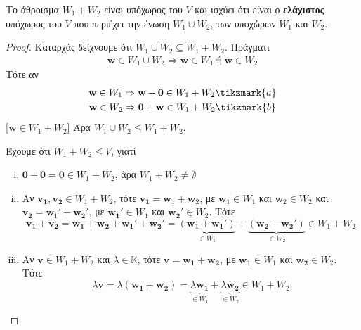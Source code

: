 \begin{prop}
  Το άθροισμα $ W_{1}+W_{2} $ είναι υπόχωρος του $V$ και ισχύει ότι είναι ο 
  \textbf{ελάχιστος} υπόχωρος του $V$ που περιέχει την ένωση 
  $ W_{1} \cup W_{2} $, των υποχώρων $ W_{1} $ και $ W_{2} $. 
\end{prop}

\begin{proof}
\item {}
  Καταρχάς δείχνουμε ότι $ W_{1} \cup W_{2} \subseteq W_{1}+W_{2} $. Πράγματι
  \begin{gather*}
    \mathbf{w} \in W_{1} \cup W_{2} \Rightarrow \mathbf{w} \in W_{1} \; \text{ή} \; 
    \mathbf{w} \in W_{2} 
  \end{gather*}
  Τότε αν
  \begin{gather*}
    \mathbf{w} \in W_{1} \Rightarrow \mathbf{w} + \mathbf{0} \in W_{1}+W_{2} 
    \tikzmark{a} \\
    \mathbf{w} \in W_{2} \Rightarrow \mathbf{0} + \mathbf{w} \in W_{1}+W_{2} 
    \tikzmark{b}
  \end{gather*}
  [$ \mathbf{w} \in W_{1}+W_{2} $]
  Άρα $ W_{1} \cup W_{2} \leq W_{1}+W_{2} $.
  \begin{myitemize}
    \item 
      Έχουμε ότι $ W_{1}+W_{2} \leq V $, γιατί
      \begin{enumerate}[i)]
        \item $ \mathbf{0}+ \mathbf{0} = \mathbf{0} \in W_{1}+W_{2} $, άρα 
          $ W_{1}+W_{2} \neq \emptyset $
        \item Αν $ \mathbf{v_{1}}, \mathbf{v_{2}} \in W_{1}+W_{2} $, τότε 
          $ \mathbf{v_{1}} = \mathbf{w}_{1}+ \mathbf{w}_{2} $, με 
          $ \mathbf{w}_{1} \in W_{1} $ και $ \mathbf{w}_{2} \in W_{2} $ και 
          $ \mathbf{v_{2}} = \mathbf{w}_{1}' + \mathbf{w_{2}}' $, με 
          $ \mathbf{w_{1}}' \in W_{1} $ και $ \mathbf{w_{2}}' \in W_{2} $. Τότε
          \[
            \mathbf{v_{1}}+ \mathbf{v_{2}} = \mathbf{w_{1}}+ \mathbf{w_{2}} + 
            \mathbf{w_{1}}' + \mathbf{w_{2}}' = \underbrace{(\mathbf{w_{1}}+
              \mathbf{w_{1}}')}_{\in W_{1}} + \underbrace{(\mathbf{w_{2}}+ 
            \mathbf{w_{2}}')}_{\in W_{2}} \in W_{1}+W_{2}
          \] 
        \item Αν $ \mathbf{v} \in W_{1}+W_{2} $ και $ \lambda \in \mathbb{K} $, 
          τότε $ \mathbf{v} = \mathbf{w_{1}}+ \mathbf{w_{2}} $, με 
          $ \mathbf{w_{1}} \in W_{1} $ και $ \mathbf{w_{2}} \in W_{2} $.  Τότε
          \[
            \lambda \mathbf{v} = \lambda (\mathbf{w_{1}}+ \mathbf{w_{2}}) = 
            \underbrace{\lambda \mathbf{w_{1}}}_{\in W_{1}} + 
            \underbrace{\lambda \mathbf{w_{2}}}_{\in W_{2}} \in W_{1}+W_{2}
          \] 
      \end{enumerate}


\end{myitemize}
\end{proof}
